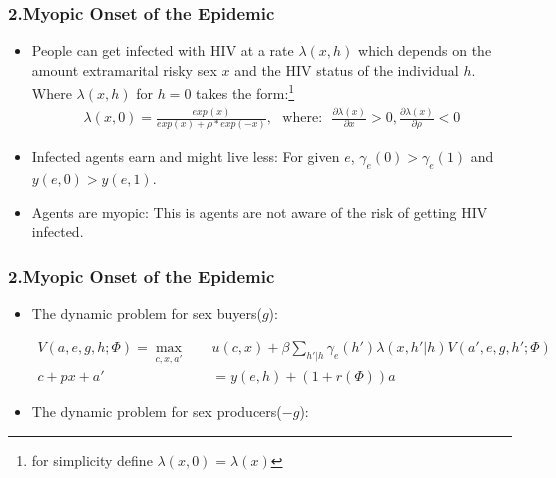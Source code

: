 \documentclass{beamer}
\begin{document}
\begin{frame}
\frametitle{2.Myopic Onset of the Epidemic}

\begin{itemize}
\item People can get infected with HIV at a rate $\lambda(x,h)$ which depends on the amount extramarital risky sex $x$  and the HIV status of the individual $h$. \\Where $\lambda(x,h)$ for $h=0$ takes the form:\footnote{for simplicity define $\lambda(x,0)=\lambda(x)$}\\
\begin{align*}
\lambda(x,0)=\frac{exp(x)}{exp(x)+\rho*exp(-x)}, \,\,\,\,\mbox{where:} \,\,\,\, \frac{\partial\lambda(x)}{\partial x}>0,\frac{\partial\lambda(x)}{\partial \rho}<0
\end{align*}
\item Infected agents earn and might live less: For given $e$, $\gamma_{e}(0)>\gamma_{e}(1)$ and $y(e,0)>y(e,1)$. 
\item Agents are myopic: This is agents are not aware of the risk of getting HIV infected. 
\end{itemize}
\end{frame}


\begin{frame}
\frametitle{2.Myopic Onset of the Epidemic}
\begin{itemize}
\item The dynamic problem for sex buyers($g$):
\begin{footnotesize}
\begin{align*}
V(a,e,g,h;\Phi) = \max_{c,x,a'} \quad &  u(c,x) + \beta \sum_{h'|h} \gamma_e(h') \lambda(x,h'|h) V(a',e,g,h';\Phi)\\
c+ px +a'&= y(e,h) + (1+r(\Phi))a 
\end{align*}
\end{footnotesize}

\item The dynamic problem for sex producers($-g$):
\end{itemize}
\end{frame}
\end{document}
